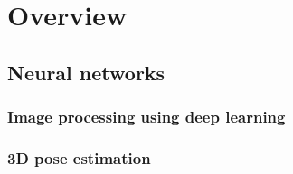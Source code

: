 \chapter{Overview}\label{chap:issues_overview}




\section{Neural networks}
  


\subsection{Image processing using deep learning}
  

\subsection{3D pose estimation}


